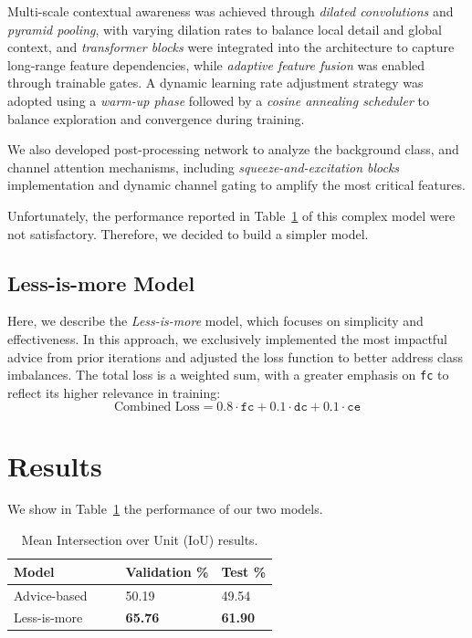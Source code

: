 \documentclass[11pt]{article}
\begin{document}
\begin{multicols*}{2}
    Multi-scale contextual awareness was achieved through \emph{dilated convolutions} and \emph{pyramid pooling}, with varying dilation rates to balance local detail and global context, and \emph{transformer blocks} were integrated into the architecture to capture long-range feature dependencies, while \emph{adaptive feature fusion} was enabled through trainable gates. A dynamic learning rate adjustment strategy was adopted using a \emph{warm-up phase} followed by a \emph{cosine annealing scheduler} to balance exploration and convergence during training. 

    We also developed post-processing network to analyze the background class, and channel attention mechanisms, including \emph{squeeze-and-excitation blocks} implementation and dynamic channel gating to amplify the most critical features.

    Unfortunately, the performance reported in Table~\ref{tab:iou} of this complex model were not satisfactory. Therefore, we decided to build a simpler model.

    \subsection{Less-is-more Model}
    
    Here, we describe the \emph{Less-is-more} model, which focuses on simplicity and effectiveness. In this approach, we exclusively implemented the most impactful advice from prior iterations and adjusted the loss function to better address class imbalances. The total loss is a weighted sum, with a greater emphasis on \texttt{fc} to reflect its higher relevance in training:  
    \begin{equation*}
    \text{Combined Loss} = 0.8 \cdot \texttt{fc} + 0.1 \cdot \texttt{dc} + 0.1 \cdot \texttt{ce}
    \end{equation*}
    

    \section{Results} %
    \label{sec:results}

    We show in Table~\ref{tab:iou} the performance of our two models.
   
    \begin{table}[H]
        \centering
        \setlength{\tabcolsep}{3pt}
        \caption{Mean Intersection over Unit (IoU) results.}
        \label{tab:iou}
        \begin{tabularx}{\linewidth}{lXX}
            \toprule
            Model & Validation \% & Test \% \\
            \midrule
            Advice-based$\qquad$ & 50.19 & 49.54 \\
            Less-is-more & \textbf{65.76} & \textbf{61.90} \\
            \bottomrule
        \end{tabularx}
    \end{table}
    

\end{multicols*}
\end{document}
